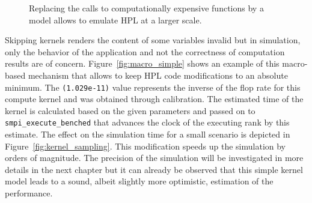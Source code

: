             \begin{figure}[htpb]
                \centering
                \caption{Replacing the calls to computationally expensive functions by a model allows to emulate HPL at
                a larger scale.}
            \end{figure}

            Skipping kernels renders the content of some variables invalid but in simulation, only the behavior of the
            application and not the correctness of computation results are of concern.  Figure~\ref{fig:macro_simple} shows
            an example of this macro-based mechanism that allows to keep HPL code modifications to an absolute minimum. The
            \texttt{(1.029e-11)} value represents the inverse of the flop rate for this compute kernel and was obtained
            through calibration. The estimated time of the kernel is calculated based on the given parameters and passed on
            to \texttt{smpi\_execute\_benched} that advances the clock of the executing rank by this estimate.  The effect
            on the simulation time for a small scenario is depicted in Figure~\ref{fig:kernel_sampling}. This modification
            speeds up the simulation by orders of magnitude. The precision of the simulation will be investigated in more
            details in the next chapter but it can already be observed that this simple kernel model leads to a sound,
            albeit slightly more optimistic, estimation of the performance.

